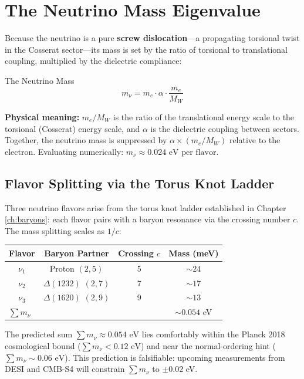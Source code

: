 \section{The Neutrino Mass Eigenvalue}
Because the neutrino is a pure \textbf{screw dislocation}---a propagating torsional twist in the Cosserat sector---its mass is set by the ratio of torsional to translational coupling, multiplied by the dielectric compliance:
\begin{resultbox}{The Neutrino Mass}
\begin{equation}
    m_\nu = m_e \cdot \alpha \cdot \frac{m_e}{M_W}
\end{equation}
\end{resultbox}

\textbf{Physical meaning:} $m_e/M_W$ is the ratio of the translational energy scale to the torsional (Cosserat) energy scale, and $\alpha$ is the dielectric coupling between sectors. Together, the neutrino mass is suppressed by $\alpha \times (m_e/M_W)$ relative to the electron. Evaluating numerically: $m_\nu \approx 0.024 \text{ eV per flavor}$.

\subsection{Flavor Splitting via the Torus Knot Ladder}
Three neutrino flavors arise from the torus knot ladder established in Chapter \ref{ch:baryons}: each flavor pairs with a baryon resonance via the crossing number $c$. The mass splitting scales as $1/c$:
\begin{center}
\begin{tabular}{|c|c|c|c|}
\hline
Flavor & Baryon Partner & Crossing $c$ & Mass (meV) \\ \hline
$\nu_1$ & Proton $(2,5)$  & 5 & $\sim 24$ \\
$\nu_2$ & $\Delta(1232)$ $(2,7)$ & 7 & $\sim 17$ \\
$\nu_3$ & $\Delta(1620)$ $(2,9)$ & 9 & $\sim 13$ \\ \hline
\multicolumn{3}{|l|}{$\sum m_\nu$} & $\sim 0.054$ eV \\ \hline
\end{tabular}
\end{center}
The predicted sum $\sum m_\nu \approx 0.054 \text{ eV}$ lies comfortably within the Planck 2018 cosmological bound ($\sum m_\nu < 0.12 \text{ eV}$) and near the normal-ordering hint ($\sum m_\nu \sim 0.06 \text{ eV}$). This prediction is falsifiable: upcoming measurements from DESI and CMB-S4 will constrain $\sum m_\nu$ to $\pm 0.02$ eV.

